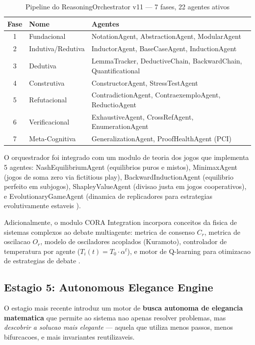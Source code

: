 \documentclass[5p]{elsarticle}
\begin{document}
\begin{table}[H]
  \centering
  \caption{Pipeline do ReasoningOrchestrator v11 — 7 fases, 22 agentes ativos}
  \label{tab:pipeline}
  \begin{tabular}{cll}
    \toprule
    \textbf{Fase} & \textbf{Nome} & \textbf{Agentes} \\
    \midrule
    1 & Fundacional & NotationAgent, AbstractionAgent, ModularAgent \\
    2 & Indutiva/Redutiva & InductorAgent, BaseCaseAgent, InductionAgent \\
    3 & Dedutiva & LemmaTracker, DeductiveChain, BackwardChain, Quantificational \\
    4 & Construtiva & ConstructorAgent, StressTestAgent \\
    5 & Refutacional & ContradictionAgent, ContraexemploAgent, ReductioAgent \\
    6 & Verificacional & ExhaustiveAgent, CrossRefAgent, EnumerationAgent \\
    7 & Meta-Cognitiva & GeneralizationAgent, ProofHealthAgent (PCI) \\
    \bottomrule
  \end{tabular}
\end{table}

O orquestrador foi integrado com um modulo de teoria dos jogos \cite{nash1950,
vonneumann1944,shapley1953} que implementa 5 agentes: NashEquilibriumAgent
(equilibrios puros e mistos), MinimaxAgent (jogos de soma zero via fictitious
play), BackwardInductionAgent (equilibrio perfeito em subjogos),
ShapleyValueAgent (divisao justa em jogos cooperativos), e EvolutionaryGameAgent
(dinamica de replicadores para estrategias evolutivamente estaveis \cite{smith1973}).

Adicionalmente, o modulo CORA Integration \cite{macedo2025} incorpora conceitos
da fisica de sistemas complexos ao debate multiagente: metrica de consenso $C_r$,
metrica de oscilacao $O_r$, modelo de osciladores acoplados (Kuramoto),
controlador de temperatura por agente ($T_i(t)=T_0\cdot\alpha^t$), e motor de
Q-learning para otimizacao de estrategias de debate \cite{bellman1954,sutton1998}.

\subsection{Estagio 5: Autonomous Elegance Engine}

O estagio mais recente \cite{elegance2026} introduz um motor de \textbf{busca
autonoma de elegancia matematica} que permite ao sistema nao apenas resolver
problemas, mas \textit{descobrir a solucao mais elegante} — aquela que utiliza
menos passos, menos bifurcacoes, e mais invariantes reutilizaveis.
\end{document}
